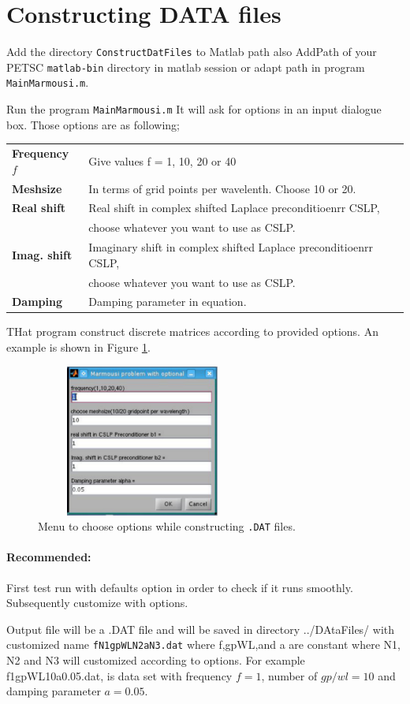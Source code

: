 \documentclass[a4paper,11pt]{article}
\begin{document}
\section{Constructing DATA files}
Add the directory \texttt{ConstructDatFiles} to Matlab path also 
AddPath of your PETSC \texttt{matlab-bin} directory in matlab session
or adapt path in program \texttt{MainMarmousi.m}. \\
\par
Run the program \texttt{MainMarmousi.m} It will ask for options in an input
dialogue box. Those options are as following; \\
\begin{table}[h]
\begin{tabular}{ll}
\textbf{Frequency} $f$ & Give values f = 1, 10, 20 or 40\\
\textbf{Meshsize} & In terms of grid points per wavelenth. Choose 10 or 20. \\
\textbf{Real shift} & Real shift in complex shifted Laplace preconditioenrr
CSLP,\\
& choose whatever you want to use as CSLP.\\
\textbf{Imag. shift}& Imaginary shift in complex shifted Laplace
preconditioenrr CSLP, \\
& choose  whatever you want to use as CSLP.  \\
\textbf{Damping}& Damping parameter in equation.\\
\end{tabular}
\end{table}
THat program  construct discrete matrices according to provided options.
An example is shown in Figure \ref{fig:fig1}.
%
\begin{figure}[h]
\centering
\includegraphics[width=7cm,height=5cm]{image1.pdf}
\caption{Menu to choose options while constructing \texttt{.DAT} files.}
\label{fig:fig1}
\end{figure}

\paragraph{Recommended:} First test run with defaults option in order to check
if it runs smoothly. Subsequently customize with options. \\
\par
Output file will be a .DAT file and will be saved in directory ../DAtaFiles/ 
with customized name \texttt{fN1gpWLN2aN3.dat} where f,gpWL,and
a are constant where N1, N2 and N3 will customized according to
options. For example f1gpWL10a0.05.dat, is data set with frequency $f=1$,
number of $gp/wl= 10$ and damping parameter $a = 0.05$. \\
\end{document}
